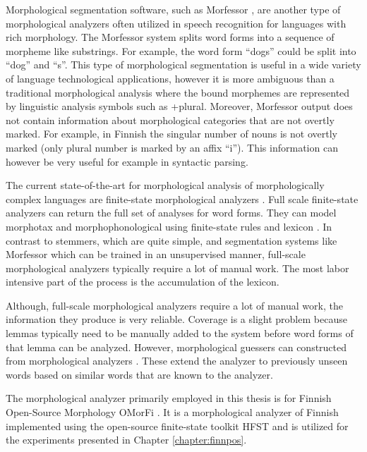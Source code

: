 Morphological segmentation software, such as Morfessor
\cite{Creutz2002}, are another type of morphological analyzers often
utilized in speech recognition for languages with rich morphology. The
Morfessor system splits word forms into a sequence of morpheme like
substrings. For example, the word form ``dogs'' could be split into
``dog'' and ``s''.  This type of morphological segmentation is useful
in a wide variety of language technological applications, however it
is more ambiguous than a traditional morphological analysis where the
bound morphemes are represented by linguistic analysis symbols such as
+plural. Moreover, Morfessor output does not contain information about
morphological categories that are not overtly marked. For example, in
Finnish the singular number of nouns is not overtly marked (only
plural number is marked by an affix ``i''). This information can
however be very useful for example in syntactic parsing.

The current state-of-the-art for morphological analysis of
morphologically complex languages are finite-state morphological
analyzers \citep{Kaplan1994,Koskenniemi1984}. Full scale finite-state
analyzers can return the full set of analyses for word forms. They can
model morphotax and morphophonological using finite-state rules and
lexicon \citep{Beesley2003}. In contrast to stemmers, which are quite
simple, and segmentation systems like Morfessor which can be trained
in an unsupervised manner, full-scale morphological analyzers
typically require a lot of manual work. The most labor intensive part
of the process is the accumulation of the lexicon. 

Although, full-scale morphological analyzers require a lot of manual
work, the information they produce is very reliable. Coverage is a
slight problem because lemmas typically need to be manually added to
the system before word forms of that lemma can be analyzed. However,
morphological guessers can constructed from morphological analyzers
\cite{Linden2009}. These extend the analyzer to previously unseen
words based on similar words that are known to the analyzer.

The morphological analyzer primarily employed in this thesis is for
Finnish Open-Source Morphology OMorFi \citep{Pirinen2011}. It is a
morphological analyzer of Finnish implemented using the open-source
finite-state toolkit HFST \cite{Linden2009hfst} and is utilized for
the experiments presented in Chapter \ref{chapter:finnpos}.
 
